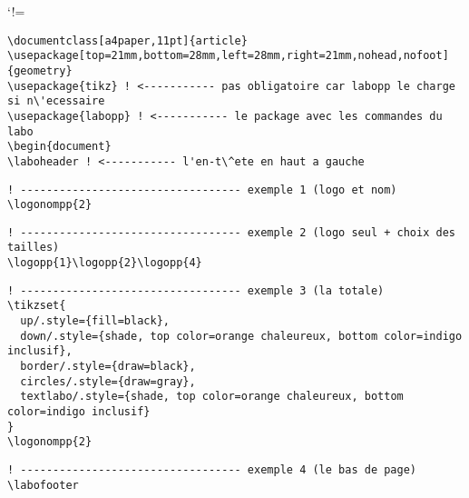 \documentclass[a4paper,11pt]{article}
\begin{document}
\laboheader

\def\CommentChar{\char37}
\catcode`!=\active
\begin{Verbatim}[defineactive=\def!{\color{orange}\CommentChar}]
\documentclass[a4paper,11pt]{article}
\usepackage[top=21mm,bottom=28mm,left=28mm,right=21mm,nohead,nofoot]{geometry}
\usepackage{tikz} ! <----------- pas obligatoire car labopp le charge si n\'ecessaire
\usepackage{labopp} ! <----------- le package avec les commandes du labo
\begin{document}
\laboheader ! <----------- l'en-t\^ete en haut a gauche
\end{Verbatim}


\begin{Verbatim}[defineactive=\def!{\color{orange}\CommentChar}]
! ---------------------------------- exemple 1 (logo et nom)
\logonompp{2}
\end{Verbatim}

\begin{Verbatim}[defineactive=\def!{\color{orange}\CommentChar}]
! ---------------------------------- exemple 2 (logo seul + choix des tailles)
\logopp{1}\logopp{2}\logopp{4}
\end{Verbatim}


\begin{Verbatim}[defineactive=\def!{\color{orange}\CommentChar}]
! ---------------------------------- exemple 3 (la totale)
\tikzset{
  up/.style={fill=black},
  down/.style={shade, top color=orange chaleureux, bottom color=indigo inclusif},
  border/.style={draw=black},
  circles/.style={draw=gray},
  textlabo/.style={shade, top color=orange chaleureux, bottom color=indigo inclusif}
}
\logonompp{2}
\end{Verbatim}
{ %
}



\vfill

\begin{Verbatim}[defineactive=\def!{\color{orange}\CommentChar}]
! ---------------------------------- exemple 4 (le bas de page)
\labofooter
\end{Verbatim}
\labofooter
\end{document}
